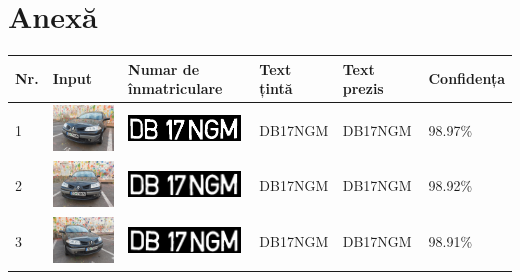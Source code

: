 \documentclass[a4paper,12pt]{report}
\begin{document}
\chapter{Anexă}
\begin{longtable}{| m{0.6cm} | m{3cm} | m{3cm} | m{1.8cm} | m{1.8cm} | m{1.8cm} |}
    \hline
    Nr. & Input                                                           & Numar de \newline înmatriculare                                 & Text \newline țintă & Text \newline prezis & Confidența \\ \hline
    \endhead
    1   & \includegraphics[width=3cm,keepaspectratio]{dataset/1_d1.jpg}   & \includegraphics[width=3cm,keepaspectratio]{segmentari/1.jpg}   & DB17NGM             & DB17NGM              & 98.97\%    \\ \hline
    2   & \includegraphics[width=3cm,keepaspectratio]{dataset/1_d2.jpg}   & \includegraphics[width=3cm,keepaspectratio]{segmentari/2.jpg}   & DB17NGM             & DB17NGM              & 98.92\%    \\ \hline
    3   & \includegraphics[width=3cm,keepaspectratio]{dataset/1_s1.jpg}   & \includegraphics[width=3cm,keepaspectratio]{segmentari/3.jpg}   & DB17NGM             & DB17NGM              & 98.91\%    \\ \hline

\end{longtable}
\end{document}
